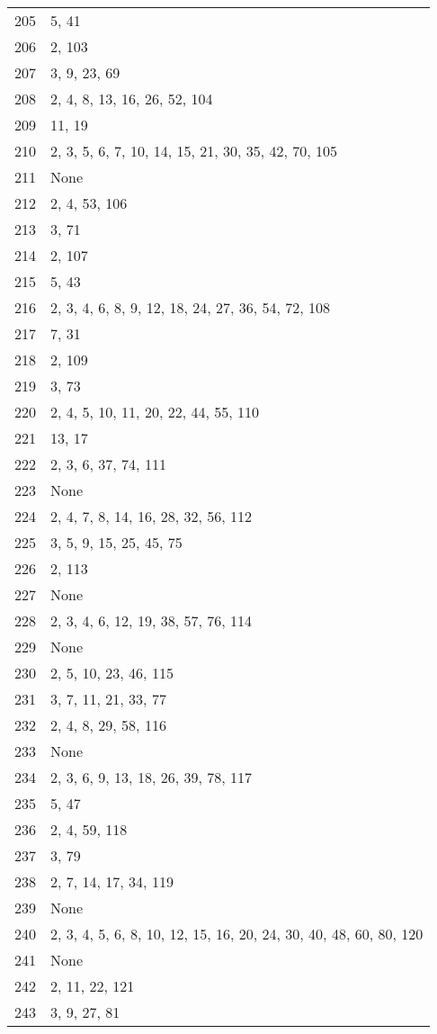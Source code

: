 \documentclass[12pt]{article}
\begin{document}
\begin{tabular}{|r|l|}
205 & 5, 41 \\ 
206 & 2, 103 \\ 
207 & 3, 9, 23, 69 \\ 
208 & 2, 4, 8, 13, 16, 26, 52, 104 \\ 
209 & 11, 19 \\ 
210 & 2, 3,  5, 6, 7, 10, 14, 15, 21, 30, 35, 42, 70, 105 \\ 
211 & None \\ 
212 & 2, 4, 53, 106 \\ 
213 & 3, 71 \\ 
214 & 2, 107 \\ 
215 & 5, 43 \\ 
216 & 2, 3, 4, 6, 8, 9, 12, 18, 24, 27, 36, 54, 72, 108 \\ 
217 & 7, 31 \\ 
218 & 2, 109 \\ 
219 & 3, 73 \\ 
220 & 2, 4, 5, 10, 11, 20, 22, 44, 55, 110 \\ 
221 & 13, 17 \\ 
222 & 2, 3, 6, 37, 74, 111 \\ 
223 & None \\ 
224 & 2, 4, 7, 8, 14, 16, 28, 32, 56, 112 \\ 
225 & 3, 5, 9, 15, 25, 45, 75 \\ 
226 & 2, 113 \\ 
227 & None \\ 
228 & 2, 3, 4, 6, 12, 19, 38, 57, 76, 114 \\ 
229 & None \\ 
230 & 2, 5, 10, 23, 46, 115 \\ 
231 & 3, 7, 11, 21, 33, 77 \\ 
232 & 2, 4, 8, 29, 58, 116 \\ 
233 & None \\ 
234 & 2, 3, 6, 9, 13, 18, 26, 39, 78, 117 \\ 
235 & 5, 47 \\ 
236 & 2, 4, 59, 118 \\ 
237 & 3, 79 \\ 
238 & 2, 7, 14, 17, 34, 119 \\ 
239 & None \\ 
240 & 2, 3, 4, 5, 6, 8, 10, 12, 15, 16, 20, 24, 30, 40, 48, 60, 80, 120 \\ 
241 & None \\ 
242 & 2, 11, 22, 121 \\ 
243 & 3, 9, 27, 81 \\ 

\end{tabular}
\end{document}
